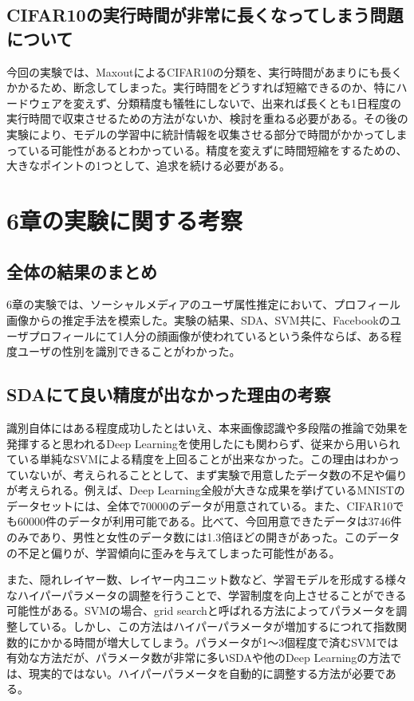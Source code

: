 \subsection{CIFAR10の実行時間が非常に長くなってしまう問題について}
今回の実験では、MaxoutによるCIFAR10の分類を、実行時間があまりにも長くかかるため、断念してしまった。実行時間をどうすれば短縮できるのか、特にハードウェアを変えず、分類精度も犠牲にしないで、出来れば長くとも1日程度の実行時間で収束させるための方法がないか、検討を重ねる必要がある。その後の実験により、モデルの学習中に統計情報を収集させる部分で時間がかかってしまっている可能性があるとわかっている。精度を変えずに時間短縮をするための、大きなポイントの1つとして、追求を続ける必要がある。

\section{6章の実験に関する考察}
\subsection{全体の結果のまとめ}
6章の実験では、ソーシャルメディアのユーザ属性推定において、プロフィール画像からの推定手法を模索した。実験の結果、SDA、SVM共に、Facebookのユーザプロフィールにて1人分の顔画像が使われているという条件ならば、ある程度ユーザの性別を識別できることがわかった。\par
\subsection{SDAにて良い精度が出なかった理由の考察}
識別自体にはある程度成功したとはいえ、本来画像認識や多段階の推論で効果を発揮すると思われるDeep Learningを使用したにも関わらず、従来から用いられている単純なSVMによる精度を上回ることが出来なかった。この理由はわかっていないが、考えられることとして、まず実験で用意したデータ数の不足や偏りが考えられる。例えば、Deep Learning全般が大きな成果を挙げているMNISTのデータセットには、全体で70000のデータが用意されている。また、CIFAR10でも60000件のデータが利用可能である。比べて、今回用意できたデータは3746件のみであり、男性と女性のデータ数には1.3倍ほどの開きがあった。このデータの不足と偏りが、学習傾向に歪みを与えてしまった可能性がある。\par
また、隠れレイヤー数、レイヤー内ユニット数など、学習モデルを形成する様々なハイパーパラメータの調整を行うことで、学習制度を向上させることができる可能性がある。SVMの場合、grid searchと呼ばれる方法によってパラメータを調整している。しかし、この方法はハイパーパラメータが増加するにつれて指数関数的にかかる時間が増大してしまう。パラメータが1〜3個程度で済むSVMでは有効な方法だが、パラメータ数が非常に多いSDAや他のDeep Learningの方法では、現実的ではない。ハイパーパラメータを自動的に調整する方法が必要である。

